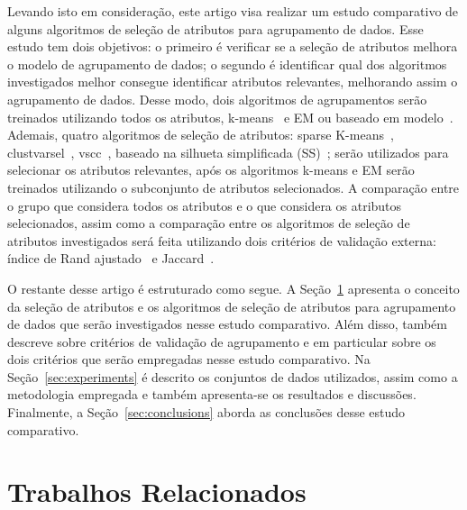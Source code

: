 \documentclass{acm_proc_article-sp}
\begin{document}
Levando isto em consideração, este artigo visa realizar um estudo comparativo de alguns algoritmos de seleção de atributos para agrupamento de dados.
Esse estudo tem dois objetivos: o primeiro é verificar se a seleção de atributos melhora o modelo de agrupamento de dados; o segundo é identificar qual dos algoritmos investigados melhor consegue identificar atributos relevantes, melhorando assim o agrupamento de dados. 
Desse modo, dois algoritmos de agrupamentos serão treinados utilizando todos os atributos, k-means~\cite{hartigan1979algorithm, macqueen1967some} e EM ou baseado em modelo~\cite{fraley2002model, dempster1977maximum,hastie2009elements}.
Ademais, quatro algoritmos de seleção de atributos: sparse K-means~\cite{witten2010framework, macqueen1967some}, clustvarsel~\cite{raftery2006variable}, vscc~\cite{andrews2013variable}, baseado na silhueta simplificada (SS)~\cite{hruschka2005feature}; serão utilizados para selecionar os atributos relevantes, após os algoritmos k-means e EM serão treinados utilizando o subconjunto de atributos selecionados.
A comparação entre o grupo que considera todos os atributos e o que considera os atributos selecionados, assim como a comparação entre os algoritmos de seleção de atributos investigados será feita utilizando dois critérios de validação externa: índice de Rand ajustado~\cite{hubert1985comparing} e Jaccard~\cite{jain1988algorithms}.

O restante desse artigo é estruturado como segue.
A Seção~\ref{sec:relatedwork} apresenta o conceito da seleção de atributos e os algoritmos de seleção de atributos para agrupamento de dados que serão investigados nesse estudo comparativo.
Além disso, também descreve sobre critérios de validação de agrupamento e em particular sobre os dois critérios que serão empregadas nesse estudo comparativo.
Na Seção~\ref{sec:experiments} é descrito os conjuntos de dados utilizados, assim como a metodologia empregada e também apresenta-se os resultados e discussões.
Finalmente, a Seção~\ref{sec:conclusions} aborda as conclusões desse estudo comparativo.

\section{Trabalhos Relacionados}
\label{sec:relatedwork}
\end{document}
